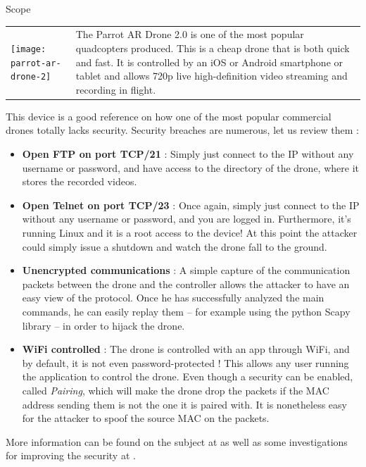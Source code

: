 \begin{chaptercover}{Scope}
\begin{center}
\begin{tabular}{m{5cm}m{12.3cm}}
\hyphenation{produced}
\texttt{[image: parrot-ar-drone-2]} & The Parrot AR Drone 2.0 is one of the most popular quadcopters produced. This is a cheap drone that is both quick and fast. It is controlled by an iOS or Android smartphone or tablet and allows 720p live high-definition video streaming and recording in flight. \\
\end{tabular}
\end{center}

This device is a good reference on how one of the most popular commercial drones totally lacks security. Security breaches are numerous, let us review them :
\begin{itemize}
  \item \textbf{Open FTP on port TCP/21} : Simply just connect to the IP without any username or password, and have access to the directory of the drone, where it stores the recorded videos.
  \item \textbf{Open Telnet on port TCP/23} : Once again, simply just connect to the IP without any username or password, and you are logged in. Furthermore, it's running Linux and it is a root access to the device! At this point the attacker could simply issue a shutdown and watch the drone fall to the ground.
  \item \textbf{Unencrypted communications} : A simple capture of the communication packets between the drone and the controller allows the attacker to have an easy view of the protocol. Once he has successfully analyzed the main commands, he can easily replay them -- for example using the python Scapy library -- in order to hijack the drone.
  \item \textbf{WiFi controlled} : The drone is controlled with an app through WiFi, and by default, it is not even password-protected ! This allows any user running the application to control the drone. Even though a security can be enabled, called \textit{Pairing}, which will make the drone drop the packets if the MAC address sending them is not the one it is paired with. It is nonetheless easy for the attacker to spoof the source MAC on the packets.
\end{itemize}

More information can be found on the subject at \cite{github-drone-hacking} as well as some investigations for improving the security at \cite{hacking-securing-ardrone2}.


\end{chaptercover}
